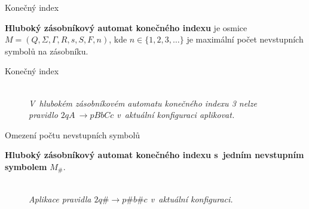 \documentclass[a4paper,fyma3]{prosper}
\theoremstyle{definition}
\begin{document}
\begin{slide}{Konečný index}

\bigskip


\textbf{Hluboký zásobníkový automat konečného indexu} je osmice $M = (Q,\Sigma,\Gamma, R, s, S, F, n)$, kde $n \in \{1,2,3,\dots\}$ je maximální počet nevstupních symbolů na zásobníku.


\end{slide}

\begin{slide}{Konečný index}

\bigskip
\bigskip
\bigskip

\begin{figure}[h!]
\centering
{} \bigskip \\
\emph{V~hlubokém zásobníkovém automatu konečného indexu 3  nelze pravidlo $2 q A~\rightarrow p BbCc$ v~aktuální konfiguraci aplikovat.}
\end{figure}


\end{slide}



\begin{slide}{Omezení počtu nevstupních symbolů}

\bigskip
\textbf{Hluboký zásobníkový automat konečného indexu s~jedním nevstupním symbolem} $M_\#$.
\bigskip

\begin{figure}[h!]
\centering
{} \bigskip \\
\emph{Aplikace pravidla $2 q \# \rightarrow p \#b\#c$ v~aktuální konfiguraci.}
\end{figure}


\end{slide}
\end{document}
